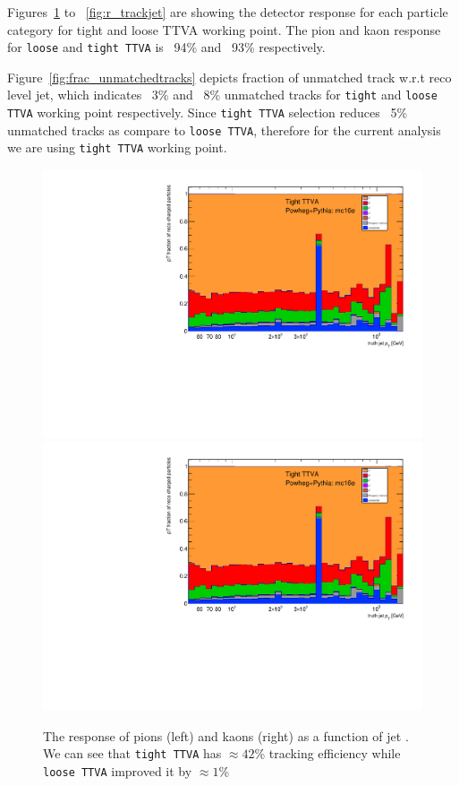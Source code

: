 Figures~\ref{fig:r_pion_kaon} to ~\ref{fig:r_trackjet} are showing the detector response for each particle category for tight and loose TTVA working point. The pion and kaon response for \texttt{loose} and \texttt{tight TTVA} is ~94\% and ~93\% respectively.

Figure~\ref{fig:frac_unmatchedtracks} depicts fraction of unmatched track w.r.t reco level jet, which indicates ~3\% and ~8\% unmatched tracks for \texttt{tight} and \texttt{loose TTVA} working point respectively. Since \texttt{tight TTVA}  selection reduces ~5\% unmatched tracks as compare to \texttt{loose TTVA}, therefore for the current analysis we are using \texttt{tight TTVA} working point. 

\begin{figure}[b]
\centering
\includegraphics[scale=0.3, page=4]{figures/jet_comp_study_powheg_Tight_pTFraction_mc16e.pdf}
\includegraphics[scale=0.3, page=5]{figures/jet_comp_study_powheg_Tight_pTFraction_mc16e.pdf}
\caption {The response of pions (left) and  kaons (right) as a function of jet \pT. We can see that \texttt{tight TTVA} has $\approx 42$\% tracking efficiency while \texttt{loose TTVA} improved it by $\approx 1$\%}
\label{fig:r_pion_kaon}
\end{figure}

